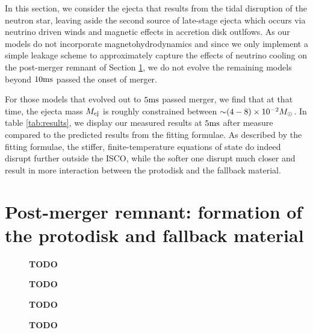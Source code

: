 In this section, we consider the ejecta that results from the tidal disruption of the neutron star, leaving aside the second source of late-stage ejecta which occurs via neutrino driven winds and magnetic effects in accretion disk outlfows.  As our models do not incorporate magnetohydrodynamics and since we only implement a simple leakage scheme to approximately capture the effects of neutrino cooling on the post-merger remnant of Section \ref{sec:diskanalysis}, we do not evolve the remaining models beyond $10 {\rm ms}$ passed the onset of merger.

For those models that evolved out to $5 {\rm ms}$ passed merger, we find that at that time, the ejecta mass $M_{\rm ej}$ is roughly constrained between $\mathord{\sim} (4 - 8) \times 10^{-2} M_\odot$.  In table \ref{tab:results}, we display our measured results at $5 {\rm ms}$ after measure compared to the predicted results from the fitting formulae.  As described by the fitting formulae, the stiffer, finite-temperature equations of state do indeed disrupt further outside the ISCO, while the softer one disrupt much closer and result in more interaction between the protodisk and the fallback material.

\section{Post-merger remnant: formation of the protodisk and fallback material}
\label{sec:diskanalysis}


\begin{figure}
	\centering
	
	\caption[]{
		\textbf{TODO}
	}
	\label{fig:diskdensities}
\end{figure}

\begin{figure}
	\centering
	
	\caption[]{
		\textbf{TODO}
	}
	\label{fig:disktemps}
\end{figure}

\begin{figure}
	\centering
	
	\caption[]{
		\textbf{TODO}
	}
	\label{fig:diskYes}
\end{figure}

\begin{figure}
	\centering
	
	\caption[]{
		\textbf{TODO}
	}
	\label{fig:diskentropies}
\end{figure}


%	
%
%	

